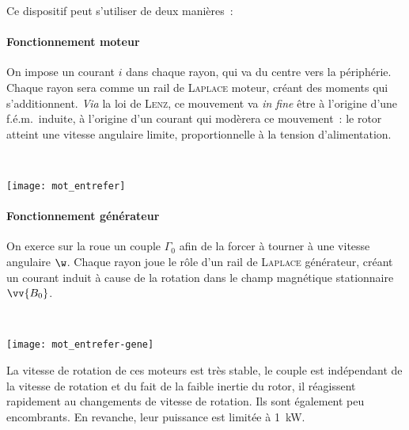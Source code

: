 \documentclass[../main/main.tex]{subfiles}
\begin{document}
Ce dispositif peut s'utiliser de deux manières~:
\bigbreak
\noindent
\begin{minipage}[t]{.65\linewidth}
	\paragraph*{Fonctionnement moteur} On impose un courant $i$ dans chaque rayon,
	qui va du centre vers la périphérie. Chaque rayon sera comme un rail de
	\textsc{Laplace} moteur, créant des moments qui s'additionnent.
	\smallbreak
	\textit{Via} la loi de \textsc{Lenz}, ce mouvement va \textit{in fine} être à
	l'origine d'une f.é.m.\ induite, à l'origine d'un courant qui modèrera ce
	mouvement~: le rotor atteint une vitesse angulaire limite, proportionnelle à
	la tension d'alimentation.
\end{minipage}
\hfill
\begin{minipage}[t]{.30\linewidth}
	~
	\vspace{-40pt}
	\begin{center}
		\texttt{[image: mot\_entrefer]}
		\label{fig:motentre}
	\end{center}
\end{minipage}

\bigbreak
\noindent
\begin{minipage}[c]{.65\linewidth}
	\paragraph*{Fonctionnement générateur} On exerce sur la roue un couple
	$\Gamma_0$ afin de la forcer à tourner à une vitesse angulaire $\w$.
	\smallbreak
	Chaque rayon joue le rôle d'un rail de \textsc{Laplace} générateur, créant un
	courant induit à cause de la rotation dans le champ magnétique stationnaire
	$\vv{B_0}$.
\end{minipage}
\hfill
\begin{minipage}[c]{.30\linewidth}
	~
	\begin{center}
		\texttt{[image: mot\_entrefer-gene]}
		\label{fig:motentrehene}
	\end{center}
\end{minipage}

La vitesse de rotation de ces moteurs est très stable, le couple est indépendant
de la vitesse de rotation et du fait de la faible inertie du rotor, il
réagissent rapidement au changements de vitesse de rotation. Ils sont également
peu encombrants. En revanche, leur puissance est limitée à \SI{1}{kW}.
\end{document}
